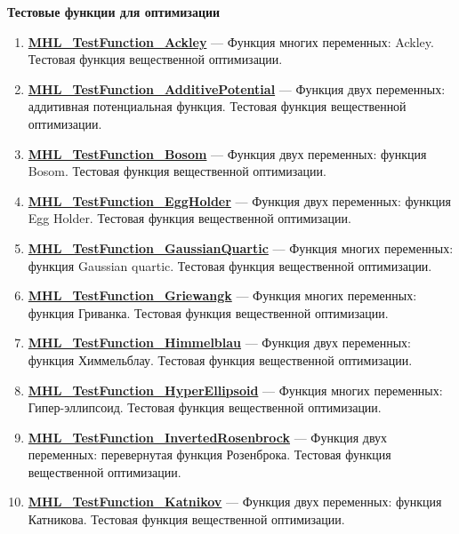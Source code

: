 \documentclass[a4paper,12pt]{article}
\begin{document}
\textbf{Тестовые функции для оптимизации}
\begin{enumerate}

\item \textbf{\hyperref[MHL_TestFunction_Ackley]{MHL\_TestFunction\_Ackley}} --- Функция многих переменных: Ackley. Тестовая функция вещественной оптимизации.

\item \textbf{\hyperref[MHL_TestFunction_AdditivePotential]{MHL\_TestFunction\_AdditivePotential}} --- Функция двух переменных: аддитивная потенциальная функция. Тестовая функция вещественной оптимизации.

\item \textbf{\hyperref[MHL_TestFunction_Bosom]{MHL\_TestFunction\_Bosom}} --- Функция двух переменных: функция Bosom. Тестовая функция вещественной оптимизации.

\item \textbf{\hyperref[MHL_TestFunction_EggHolder]{MHL\_TestFunction\_EggHolder}} --- Функция двух переменных: функция Egg Holder. Тестовая функция вещественной оптимизации.

\item \textbf{\hyperref[MHL_TestFunction_GaussianQuartic]{MHL\_TestFunction\_GaussianQuartic}} --- Функция многих переменных: функция Gaussian quartic. Тестовая функция вещественной оптимизации.

\item \textbf{\hyperref[MHL_TestFunction_Griewangk]{MHL\_TestFunction\_Griewangk}} --- Функция многих переменных: функция Гриванка. Тестовая функция вещественной оптимизации.

\item \textbf{\hyperref[MHL_TestFunction_Himmelblau]{MHL\_TestFunction\_Himmelblau}} --- Функция двух переменных: функция Химмельблау. Тестовая функция вещественной оптимизации.

\item \textbf{\hyperref[MHL_TestFunction_HyperEllipsoid]{MHL\_TestFunction\_HyperEllipsoid}} --- Функция многих переменных: Гипер-эллипсоид. Тестовая функция вещественной оптимизации.

\item \textbf{\hyperref[MHL_TestFunction_InvertedRosenbrock]{MHL\_TestFunction\_InvertedRosenbrock}} --- Функция двух переменных: перевернутая функция Розенброка. Тестовая функция вещественной оптимизации.

\item \textbf{\hyperref[MHL_TestFunction_Katnikov]{MHL\_TestFunction\_Katnikov}} --- Функция двух переменных: функция Катникова. Тестовая функция вещественной оптимизации.


\end{enumerate}
\end{document}
